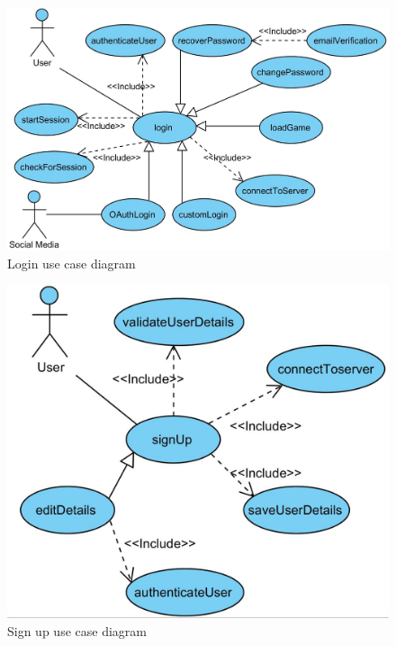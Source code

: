 \documentclass[letterpaper]{article}
\begin{document}
		\vspace{0.2in}
		
		\newpage
		\section*{\colorbox{blue}{}} 
		
		\vspace{0.2in}
		
		\begin{figure}[H]
		\centering
		\includegraphics[width=180mm]{login}
		\caption{Login use case diagram}
		\label{overflow}
		\end{figure}
		
		\vspace{0.2in}
		
		\begin{figure}[H]
		\centering
		\includegraphics[width=180mm]{signup}
		\caption{Sign up use case diagram}
		\label{overflow}
		\end{figure}
		
\end{document}

